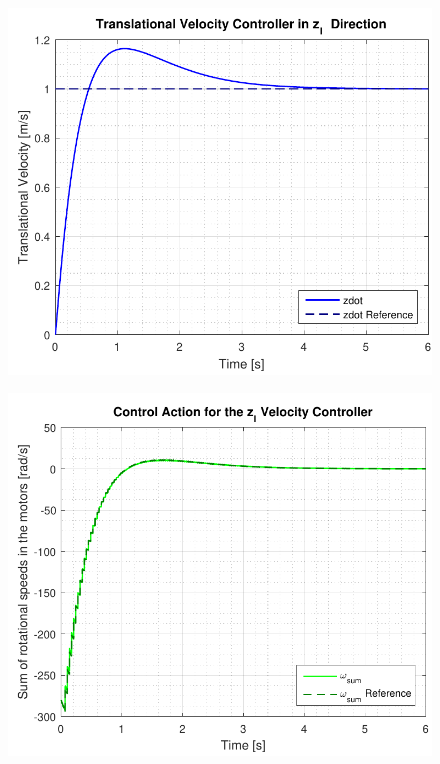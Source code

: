 \begin{minipage}{\linewidth}
    \begin{minipage}{0.45\linewidth}
        \begin{figure}[H]
            \vspace{-.4cm}
            \includegraphics[scale=.5]{figures/velocityControllerZ}
            \centering			
            \label{fig:velocityControllerZ}
        \end{figure}
    \end{minipage}
    \hspace{0.03\linewidth}
    \begin{minipage}{0.45\linewidth}
        \begin{figure}[H]
            \includegraphics[scale=.5]{figures/velocityControllerZAction}

\end{figure}
\end{minipage}
\end{minipage}

